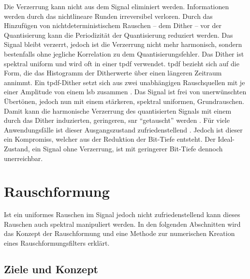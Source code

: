 Die Verzerrung kann nicht aus dem Signal eliminiert werden.
Informationen werden durch das nichtlineare Runden irreversibel verloren.
Durch das Hinzufügen von nichtdeterministischem Rauschen -- dem Dither -- vor der Quantisierung kann die Periodizität der Quantisierung reduziert werden.
Das Signal bleibt verzerrt, jedoch ist die Verzerrung nicht mehr harmonisch, sondern bestenfalls ohne jegliche Korrelation zu dem Quantisierungsfehler.
Das Dither ist spektral uniform und wird oft in einer \gls{tpdf} verwendet.
\gls{tpdf} bezieht sich auf die Form, die das Histogramm der Ditherwerte über einen längeren Zeitraum annimmt.
Ein \gls{tpdf}-Dither setzt sich aus zwei unabhängigen Rauschquellen mit je einer Amplitude von einem \gls{lsb} zusammen \autocite[S. 507 f.]{dither}\autocite[S. 23 ff. und S. 30 ff.]{dsp-guide}.
Das Signal ist frei von unerwünschten Übertönen, jedoch nun mit einem stärkeren, spektral uniformen, Grundrauschen.
Damit kann die harmonische Verzerrung des quantisierten Signals mit einem durch das Dither induzierten, geringeren, \gls{snr} \enquote{getauscht} werden \autocite[S. 147]{noise-shaping}.
Für viele Anwendungsfälle ist dieser Ausgangszustand zufriedenstellend \autocite[S. 514]{dither}.
Jedoch ist dieser ein Kompromiss, welcher aus der Reduktion der Bit-Tiefe entsteht.
Der Ideal-Zustand, ein Signal ohne Verzerrung, ist mit geringerer Bit-Tiefe dennoch unerreichbar.

\section{Rauschformung}

Ist ein uniformes Rauschen im Signal jedoch nicht zufriedenstellend kann dieses Rauschen auch spektral manipuliert werden.
In den folgenden Abschnitten wird das Konzept der Rauschformung und eine Methode zur numerischen Kreation eines Rauschformungsfilters erklärt.

\subsection{Ziele und Konzept}

